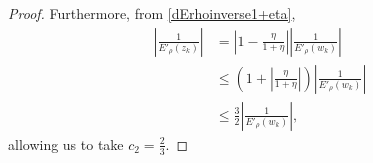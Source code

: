 \documentclass[10pt,a4paper]{amsart}
\begin{document}
\begin{proof}
Furthermore, from \eqref{dErhoinverse1+eta},
\begin{align*}
\left| \frac{1}{E'_\rho(z_k)} \right| &= \left| 1 - \frac{\eta}{1+\eta} \right|\left| \frac{1}{E'_\rho(w_k)} \right|\\
&\leq \left(1 + \left|\frac{\eta}{1+\eta}\right| \right) \left| \frac{1}{E'_\rho(w_k)} \right| \\
&\leq \frac{3}{2}\left|\frac{1}{E'_\rho(w_k)} \right|,
\end{align*}
allowing us to take $c_2 = \frac{2}{3}$.
\end{proof}
\end{document}
